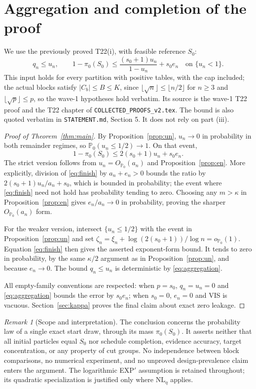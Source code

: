 \documentclass[11pt]{article}
\theoremstyle{remark}\newtheorem{remark}{Remark}
\newcommand{\PP}{\mathbb P_0}
\newcommand{\op}{o_{\PP}}
\newcommand{\Op}{O_{\PP}}
\begin{document}
\section{Aggregation and completion of the proof}\label{sec:aggregation}

We use the previously proved T22(i), with feasible reference $S_0$:
\begin{equation}\label{eq:aggregation}
 q_n\le u_n,\qquad
 1-\pi_0(S_0)\le\frac{(s_0+1)u_n}{1-u_n}+s_0e_n
 \quad\text{on }\{u_n<1\}.
\end{equation}
This input holds for every partition with positive tables, with the cap
included; the actual blocks satisfy $|C_b|\le B\le K$, since
$\lfloor\sqrt n\rfloor\le\lfloor n/2\rfloor$ for $n\ge3$ and
$\lfloor\sqrt p\rfloor\le p$, so the wave-1 hypotheses hold verbatim.
Its source is the wave-1 T22 proof and the T22 chapter of
\texttt{COLLECTED\_PROOFS\_v2.tex}. The bound is also quoted verbatim in
\texttt{STATEMENT.md}, Section 5. It does not rely on part (iii).

\begin{proof}[Proof of Theorem~\ref{thm:main}]
By Proposition~\ref{prop:un}, $u_n\to0$ in probability in both remainder
regimes, so $\PP(u_n\le1/2)\to1$. On that event,
\begin{equation}\label{eq:finish}
 1-\pi_0(S_0)\le2(s_0+1)u_n+s_0e_n.
\end{equation}
The strict version follows from $u_n=\Op(a_n)$ and
Proposition~\ref{prop:en}. More explicitly, division of
\eqref{eq:finish} by $a_n+e_n>0$ bounds the ratio by
$2(s_0+1)u_n/a_n+s_0$, which is bounded in probability; the event
where \eqref{eq:finish} need not hold has probability tending to zero.
Choosing any $m>\kappa$ in Proposition~\ref{prop:en} gives
$e_n/a_n\to0$ in probability, proving the sharper $\Op(a_n)$ form.

For the weaker version, intersect $\{u_n\le1/2\}$ with the event in
Proposition~\ref{prop:un} and set
$\zeta_n=\xi_n+\log(2(s_0+1))/\log n=\op(1)$. Equation
\eqref{eq:finish} then gives the asserted exponent-form bound. It tends
to zero in probability, by the same $\kappa/2$ argument as in
Proposition~\ref{prop:un}, and because $e_n\to0$. The bound
$q_n\le u_n$ is deterministic by \eqref{eq:aggregation}.

All empty-family conventions are respected: when $p=s_0$, $q_n=u_n=0$
and \eqref{eq:aggregation} bounds the error by $s_0e_n$; when $s_0=0$,
$e_n=0$ and VIS is vacuous. Section~\ref{sec:kappa} proves the final
claim about exact zero leakage.
\end{proof}

\begin{remark}[Scope and interpretation]
The conclusion concerns the probability law of a single exact start draw,
through its mass $\pi_0(S_0)$. It asserts neither that all initial particles
equal $S_0$ nor schedule completion, evidence accuracy, target concentration,
or any property of cut groups. No independence between block comparisons,
no numerical experiment, and no unproved design-prevalence claim enters the
argument. The logarithmic EXP$'$ assumption is retained throughout; its
quadratic specialization is justified only where $\mathrm{NL}_\eta$ applies.
\end{remark}
\end{document}
